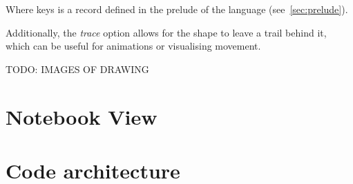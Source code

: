 Where keys is a record defined in the prelude of the language (see~\autoref{sec:prelude}).

Additionally, the \textit{trace} option allows for the shape to leave a trail behind it, which can be useful for
animations or visualising movement.

TODO: IMAGES OF DRAWING

\section{Notebook View}\label{sec:notebook-view}

\section{Code architecture}\label{sec:code-architecture}